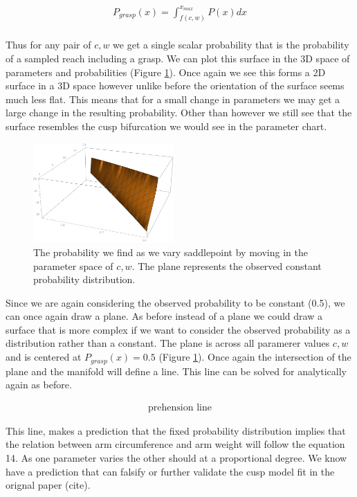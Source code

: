 \documentclass[letterpaper]{article}
\begin{document}
\begin{eqnarray}
    P_{grasp}(x) = \int_{f(c,w)}^{x_{max}}P(x)dx\\
\end{eqnarray}

Thus for any pair of $c,w$ we get a single scalar probability that is the probability
of a sampled reach including a grasp. We can plot this surface in the 3D space of 
parameters and probabilities (Figure \ref{fig6}). Once again we see this forms a 
2D surface in a 3D space however unlike before the orientation of the surface seems much
less flat. This means that for a small change in parameters we may get a large change in
the resulting probability. Other than however we still see that the surface resembles the 
cusp bifurcation we would see in the parameter chart.

\begin{figure}[t]
\begin{center}
\includegraphics[width=2.1in,angle=0]{./saddle_prehension.png}
\caption{The probability we find as we vary saddlepoint by moving in the 
parameter space of $c,w$. The plane represents the observed constant probability 
distribution.}
\label{fig6}
\end{center}
\end{figure}

Since we are again considering the observed probability to be constant (0.5), we can once 
again draw a plane. As before instead of a plane we could draw a surface that is more complex
if we want to consider the observed probability as a distribution rather than a constant. The
plane is across all paramerer values $c,w$ and is centered at $P_{grasp}(x) = 0.5$
(Figure \ref{fig6}). Once again the intersection of the plane and the manifold will define
a line. This line can be solved for analytically again as before.

\begin{eqnarray}
  \text{prehension line}
\end{eqnarray}

This line, makes a prediction that the fixed probability distribution implies that the
relation between arm circumference and arm weight will
follow the equation 14. As one parameter varies the other should at a proportional degree.
We know have a prediction that can falsify or further validate the cusp model fit in the 
orignal paper (cite).
\end{document}
